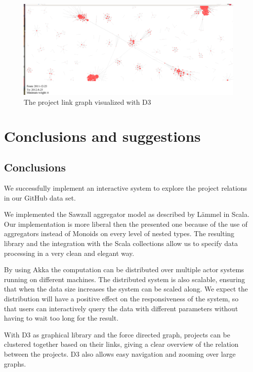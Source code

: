 \documentclass[10pt,a4paper]{article}
\begin{document}
\begin{figure}[htb]
    \centering
    \includegraphics[width=\textwidth]{d3-graph}
    \caption{The project link graph visualized with D3}
    \label{fig:d3-graph}
\end{figure}

\section{Conclusions and suggestions}\label{sec:conclusions}

\subsection{Conclusions}

We successfully implement an interactive system to explore the project relations in our GitHub data set.

We implemented the Sawzall aggregator model as described by L\"ammel in Scala. Our implementation is more liberal then the presented one because of the use of aggregators instead of Monoids on every level of nested types. The resulting library and the integration with the Scala collections allow us to specify data processing in a very clean and elegant way.

By using Akka the computation can be distributed over multiple actor systems running on different machines. The distributed system is also scalable, ensuring that when the data size increases the system can be scaled along. We expect the distribution will have a positive effect on the responsiveness of the system, so that users can interactively query the data with different parameters without having to wait too long for the result.

With D3 as graphical library and the force directed graph, projects can be clustered together based on their links, giving a clear overview of the relation between the projects. D3 also allows easy navigation and zooming over large graphs.
\end{document}
